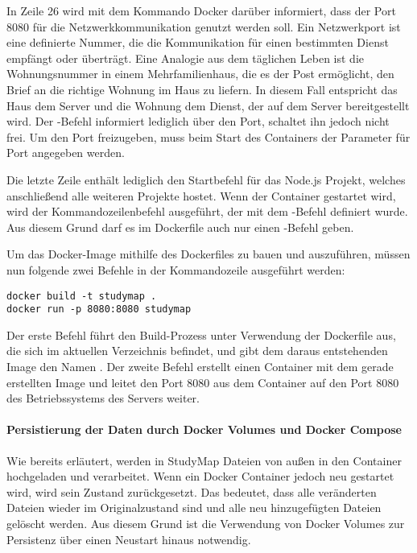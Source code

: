 In Zeile 26 wird mit dem Kommando  Docker darüber informiert, dass der Port 8080 für die Netzwerkkommunikation genutzt werden soll. Ein Netzwerkport ist eine definierte Nummer, die die Kommunikation für einen bestimmten Dienst empfängt oder überträgt. \parencite{wright_was_2022} Eine Analogie aus dem täglichen Leben ist die Wohnungsnummer in einem Mehrfamilienhaus, die es der Post ermöglicht, den Brief an die richtige Wohnung im Haus zu liefern. In diesem Fall entspricht das Haus dem Server und die Wohnung dem Dienst, der auf dem Server bereitgestellt wird. Der -Befehl informiert lediglich über den Port, schaltet ihn jedoch nicht frei. Um den Port freizugeben, muss beim Start des Containers der Parameter  für Port angegeben werden. \parencite{docker_inc_dockerfile_2024}

Die letzte Zeile enthält lediglich den Startbefehl für das Node.js Projekt, welches anschließend alle weiteren Projekte hostet. Wenn der Container gestartet wird, wird der Kommandozeilenbefehl ausgeführt, der mit dem -Befehl definiert wurde. Aus diesem Grund darf es im Dockerfile auch nur einen -Befehl geben. \parencite{docker_inc_dockerfile_2024}

Um das Docker-Image mithilfe des Dockerfiles zu bauen und auszuführen, müssen nun folgende zwei Befehle in der Kommandozeile ausgeführt werden:
\begin{lstlisting}[style=Python]
docker build -t studymap .
docker run -p 8080:8080 studymap
\end{lstlisting}

Der erste Befehl führt den Build-Prozess unter Verwendung der Dockerfile aus, die sich im aktuellen Verzeichnis befindet, und gibt dem daraus entstehenden Image den Namen . Der zweite Befehl erstellt einen Container mit dem gerade erstellten Image und leitet den Port 8080 aus dem Container auf den Port 8080 des Betriebssystems des Servers weiter.

\paragraph*{Persistierung der Daten durch Docker Volumes und Docker Compose}
Wie bereits erläutert, werden in StudyMap Dateien von außen in den Container hochgeladen und verarbeitet. Wenn ein Docker Container jedoch neu gestartet wird, wird sein Zustand zurückgesetzt. Das bedeutet, dass alle veränderten Dateien wieder im Originalzustand sind und alle neu hinzugefügten Dateien gelöscht werden. Aus diesem Grund ist die Verwendung von Docker Volumes zur Persistenz über einen Neustart hinaus notwendig.

